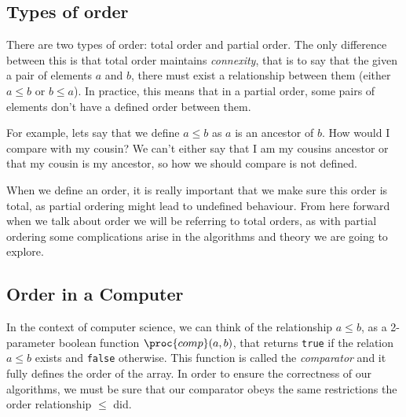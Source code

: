 \documentclass{article}
\begin{document}
\subsection{Types of order}

There are two types of order: total order and partial order. The only difference between this is that total order maintains \textit{connexity}, that is to say that the given a pair of elements $a$ and $b$, there must exist a relationship between them (either $a \leq b$ or $b \leq a$). In practice, this means that in a partial order, some pairs of elements don't have a defined order between them. 

For example, lets say that we define $a \leq b$ as $a$ is an ancestor of $b$. How would I compare with my cousin? We can't either say that I am my cousins ancestor or that my cousin is my ancestor, so how we should compare is not defined. 

When we define an order, it is really important that we make sure this order is total, as partial ordering might lead to undefined behaviour. From here forward when we talk about order we will be referring to total orders, as with partial ordering some complications arise in the algorithms and theory we are going to explore.

\subsection{Order in a Computer}

In the context of computer science, we can think of the relationship $a \leq b$, as a 2-parameter boolean function $\proc{comp}(a, b)$, that returns \texttt{true} if the relation $a \leq b$ exists and \texttt{false} otherwise. This function is called the \textit{comparator} and it fully defines the order of the array. In order to ensure the correctness of our algorithms, we must be sure that our comparator obeys the same restrictions the order relationship $\leq$ did.
\end{document}
